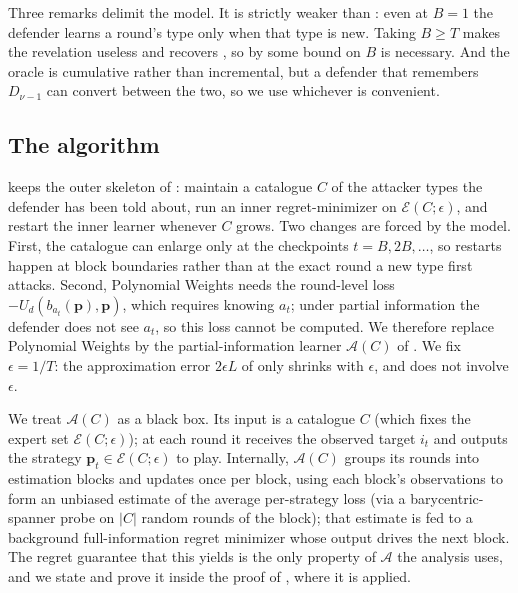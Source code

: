 \documentclass[letterpaper,9pt,twocolumn]{extarticle}
\newcommand{\pvec}{\mathbf{p}}
\newcommand{\cE}{\mathcal{E}}
\theoremstyle{plain}
\theoremstyle{definition}
\theoremstyle{remark}
\begin{document}
Three remarks delimit the model. It is strictly weaker than
: even at $B=1$ the defender learns a round's type only
when that type is new. Taking $B\ge T$ makes the revelation useless and
recovers , so by  some bound on $B$
is necessary. And the oracle is
cumulative rather than incremental, but a defender that remembers $D_{\nu-1}$
can convert between the two, so we use whichever is convenient.

\subsection{The algorithm}

 keeps the outer skeleton of : maintain a
catalogue $C$ of the attacker types the defender has been told about,
run an inner regret-minimizer on $\cE(C;\epsilon)$, and restart the
inner learner whenever $C$ grows. Two changes are forced by the model.
First, the catalogue can enlarge only at the checkpoints $t=B,2B,\dots$,
so restarts happen at block boundaries rather than at the exact round a
new type first attacks. Second, Polynomial Weights needs the round-level
loss $-U_d(b_{a_t}(\pvec),\pvec)$, which requires knowing $a_t$; under
partial information the defender does not see $a_t$, so this loss cannot
be computed. We therefore replace Polynomial Weights by the
partial-information learner $\mathcal{A}(C)$ of
\citet[Algorithm 1]{balcan2015}. We fix $\epsilon=1/T$: the approximation
error $2\epsilon L$ of  only shrinks with $\epsilon$, and
 does not involve $\epsilon$.

We treat $\mathcal{A}(C)$ as a black box. Its input is a catalogue $C$
(which fixes the expert set $\cE(C;\epsilon)$); at each round it receives
the observed target $i_t$ and outputs the strategy
$\pvec_t\in\cE(C;\epsilon)$ to play. Internally, $\mathcal{A}(C)$ groups
its rounds into estimation blocks and updates once per block, using each
block's observations to form an unbiased estimate of the average
per-strategy loss (via a barycentric-spanner probe on $|C|$ random rounds
of the block); that estimate is fed to a background full-information
regret minimizer whose output drives the next block. The regret guarantee
that this yields is the only property of $\mathcal{A}$ the analysis uses,
and we state and prove it inside the proof of , where it
is applied.
\end{document}
